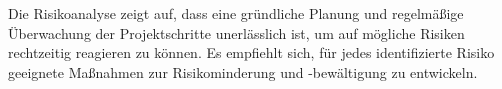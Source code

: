 Die Risikoanalyse zeigt auf, dass eine gründliche Planung und regelmäßige Überwachung der Projektschritte unerlässlich ist, um auf mögliche Risiken rechtzeitig reagieren zu können. Es empfiehlt sich, für jedes identifizierte Risiko geeignete Maßnahmen zur Risikominderung und -bewältigung zu entwickeln.\\






